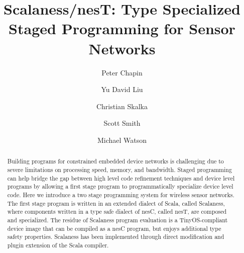 \title{Scalaness/nesT: Type Specialized Staged Programming for Sensor Networks}

\author{
Peter Chapin \and 
Yu David Liu \and 
Christian Skalka \and 
Scott Smith \and 
Michael Watson
}

\maketitle

\begin{abstract}
  Building programs for constrained embedded device networks is challenging due to severe
  limitations on processing speed, memory, and bandwidth. Staged programming can help bridge the
  gap between high level code refinement techniques and device level programs by allowing a
  first stage program to programmatically specialize device level code. Here we introduce a two
  stage programming system for wireless sensor networks. The first stage program is written in
  an extended dialect of Scala, called Scalaness, where components written in a type safe
  dialect of nesC, called nesT, are composed and specialized. The residue of Scalaness program
  evaluation is a TinyOS-compliant device image that can be compiled as a nesC program, but
  enjoys additional type safety properties. Scalaness has been implemented through direct
  modification and plugin extension of the Scala compiler.
\end{abstract}

